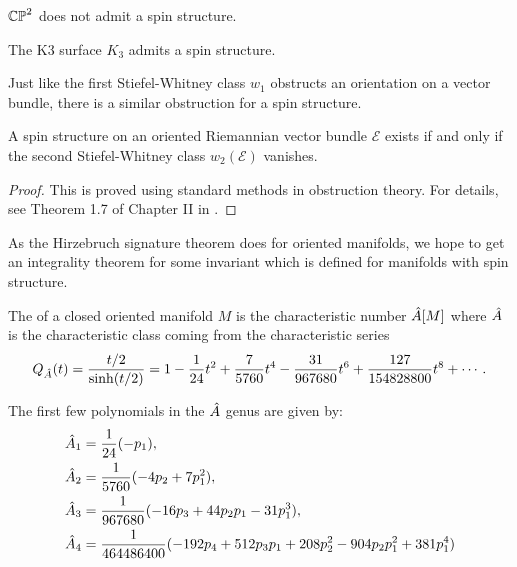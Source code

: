\begin{example}
	$\mathbb{CP}^2$ does not admit a spin structure.
\end{example}

\begin{example}
	The K3 surface $K_3$ admits a spin structure.
\end{example}

Just like the first Stiefel-Whitney class $w_1$ obstructs an orientation on a vector bundle, there is a similar obstruction for a spin structure.

\begin{theorem}
	A spin structure on an oriented Riemannian vector bundle $\mathcal{E}$ exists if and only if the second Stiefel-Whitney class $w_2(\mathcal{E})$ vanishes.
\end{theorem}
\begin{proof}
	This is proved using standard methods in obstruction theory. For details, see Theorem 1.7 of Chapter II in \cite{lawson1989spin}.
\end{proof}


As the Hirzebruch signature theorem does for oriented manifolds, we hope to get an integrality theorem for some invariant which is defined for manifolds with spin structure.

\begin{definition}
	The  of a closed oriented manifold $M$ is the characteristic number ${\hat{A}}[M]$ where ${\hat{A}}$ is the characteristic class coming from the characteristic series
	\[
		Q_{{\hat{A}}}(t) = \frac{t/2}{\sinh(t/2)} = 1 - \frac{1}{24} t^2 + \frac{7}{5760} t^4 - \frac{31}{967680} t^6 + \frac{127}{154828800}t^8+\cdots.
	\]
\end{definition}


\begin{example}
	The first few polynomials in the ${\hat{A}}$ genus are given by:
	\[
		\begin{aligned}
			{\hat{A}}_1 & = \frac{1}{24}(-p_1),                                                  \\
			{\hat{A}}_2 & = \frac{1}{5760}(-4p_2 + 7p_1^2),                                      \\
			{\hat{A}}_3 & = \frac{1}{967680}(-16p_3+44p_2p_1-31p_1^3),                           \\
			{\hat{A}}_4 & = \frac{1}{464486400}(-192p_4+512p_3p_1+208p_2^2-904p_2p_1^2+381p_1^4)
		\end{aligned}
	\]
\end{example}

